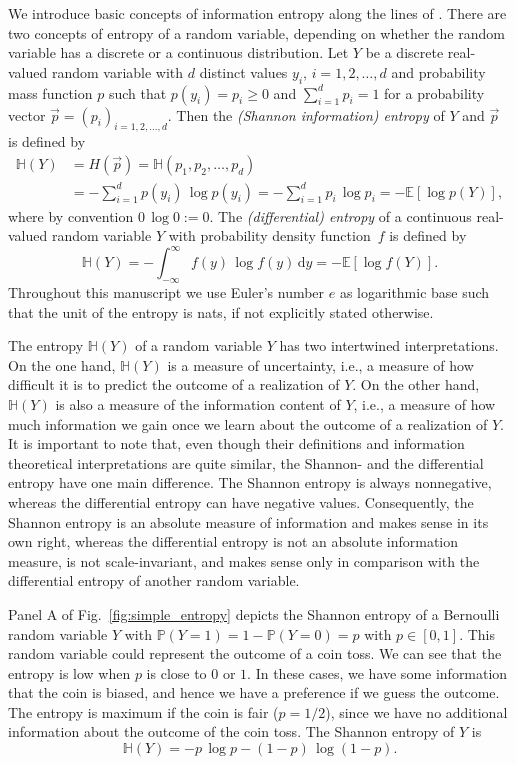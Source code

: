 \documentclass[smallextended]{svjour3}
\renewcommand{\P}{\mathbb{P}}
\newcommand{\E}{\mathbb{E}}
\renewcommand{\H}{\mathbb{H}}
\newcommand{\suml}{\sum\limits}
\newcommand{\dd}[1]{\,\mathrm{d}#1}
\newcommand{\ie}{i.e.}
\newcommand{\pdf}{probability density function}
\begin{document}
We introduce basic concepts of information entropy along the lines of \citet{Cover2006}.
There are two concepts of entropy of a random variable, depending on whether the random variable has a discrete or a continuous distribution.
Let $Y$ be a discrete real-valued random variable with $d$ distinct values $y_i,\,i=1,2,\ldots, d$ and probability mass function $p$ such that $p(y_i) = p_i\geq 0$ and $\sum_{i=1}^d p_i = 1$ for a probability vector $\vec{p}=(p_i)_{i=1, 2, \ldots,d}$.
Then the \emph{(Shannon information) entropy} of $Y$ and $\vec{p}$ is defined by
\begin{equation*}
  \begin{aligned}
    \H(Y) &= H(\vec{p}) = \H(p_1,p_2,\ldots,p_d)\\
    &= -\suml_{i=1}^d p(y_i)\,\log p(y_i)
    = -\suml_{i=1}^d p_i\,\log p_i
    = -\E\left[\log p(Y)\right],
  \end{aligned}
\end{equation*}
where by convention $0\,\log 0:=0$.
The \emph{(differential) entropy} of a continuous real-valued random variable $Y$ with \pdf\ $f$ is defined by
\begin{equation*}
	\H(Y) = -\int_{-\infty}^{\infty} f(y)\,\log f(y)\dd{y} = -\E\left[\log f(Y)\right].
\end{equation*}
Throughout this manuscript we use Euler's number $e$ as logarithmic base such that the unit of the entropy is nats, if not explicitly stated otherwise.

The entropy $\H(Y)$ of a random variable $Y$ has two intertwined interpretations.
On the one hand, $\H(Y)$ is a measure of uncertainty, \ie, a measure of how difficult it is to predict the outcome of a realization of $Y$.
On the other hand, $\H(Y)$ is also a measure of the information content of $Y$, \ie, a measure of how much information we gain once we learn about the outcome of a realization of $Y$.
It is important to note that, even though their definitions and information theoretical interpretations are quite similar, the Shannon- and the differential entropy have one main difference.
The Shannon entropy is always nonnegative, whereas the differential entropy can have negative values.
Consequently, the Shannon entropy is an absolute measure of information and makes sense in its own right, whereas the differential entropy is not an absolute information measure, is not scale-invariant, and makes sense only in comparison with the differential entropy of another random variable.

Panel A of Fig.~\ref{fig:simple_entropy} depicts the Shannon entropy of a Bernoulli random variable $Y$ with $\P(Y=1)=1-\P(Y=0)=p$ with $p\in[0,1]$.
This random variable could represent the outcome of a coin toss.
We can see that the entropy is low when $p$ is close to $0$ or $1$.
In these cases, we have some information that the coin is biased, and hence we have a preference if we guess the outcome.
The entropy is maximum if the coin is fair ($p=1/2$), since we have no additional information about the outcome of the coin toss.
The Shannon entropy of $Y$ is
\begin{equation*}
	\H(Y) = -p\,\log p - (1-p)\,\log(1-p).
\end{equation*}
\end{document}
